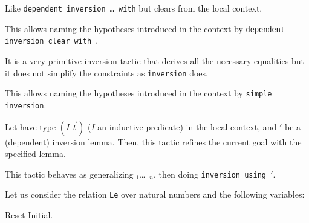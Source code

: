\begin{Variants}
\item {}
  {}

  Like \texttt{dependent inversion \dots\ with} but clears {\ident} from
  the local context.

\item {}
  {}

  This allows naming the hypotheses introduced in the context by
  \texttt{dependent inversion\_clear {\ident} with \term}.

\item {} {}

  It is a very primitive inversion tactic that derives all the necessary
  equalities  but it does not simplify the  constraints as
  \texttt{inversion} does.

\item {} {}

  This allows naming the hypotheses introduced in the context by
  \texttt{simple inversion}.

\item {} {}

  Let {\ident} have type $(I~\vec{t})$ ($I$ an inductive
  predicate) in the local context, and \ident$'$ be a (dependent) inversion
  lemma. Then, this tactic refines the current goal with the specified
  lemma.

\item {} {}

  This tactic behaves as generalizing \ident$_1$\dots\ \ident$_n$,
  then doing \texttt{inversion {\ident} using \ident$'$}.

\end{Variants}

\firstexample
{}
\label{inversion-examples}

Let us consider the relation \texttt{Le} over natural numbers and the
following variables:

\begin{coq_eval}
Reset Initial.
\end{coq_eval}

